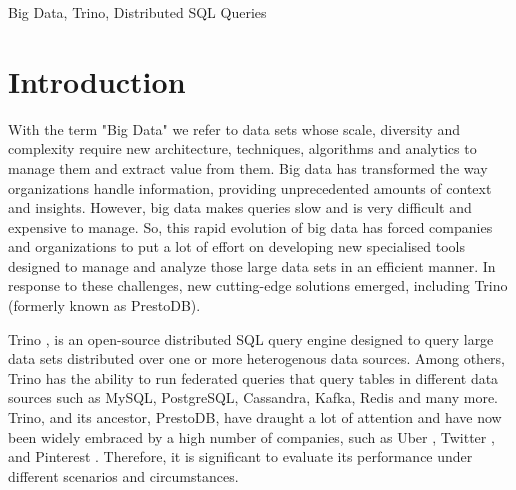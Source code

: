 \documentclass[conference]{IEEEtran}
\begin{document}
\begin{IEEEkeywords}
	Big Data, Trino, Distributed SQL Queries
\end{IEEEkeywords}

\section{Introduction}
With the term "Big Data" we refer to data sets whose scale, diversity and complexity require new
architecture, techniques, algorithms and analytics to manage them and extract value from them.
Big data has transformed the way organizations handle information, providing unprecedented
amounts of context and insights. However, big data makes queries slow and is very difficult and
expensive to manage. So, this rapid evolution of big data has forced companies and organizations
to put a lot of effort on  developing new specialised tools designed to manage and analyze those
large data sets in an efficient manner. In response to these challenges, new cutting-edge solutions
emerged, including Trino (formerly known as PrestoDB).

Trino \cite{b3}, is an open-source distributed SQL query engine designed to query large data sets distributed over
one or more heterogenous data sources. Among others, Trino has the ability to run federated queries that
query tables in different data sources such as MySQL, PostgreSQL, Cassandra, Kafka, Redis and many more.
Trino, and its ancestor, PrestoDB, have draught a lot of attention and have now been widely embraced by a high number of
companies, such as Uber \cite{b4}, Twitter \cite{b5}, \cite{b6} and Pinterest \cite{b7}. Therefore, it is significant to evaluate its performance under different
scenarios and circumstances.
\end{document}
